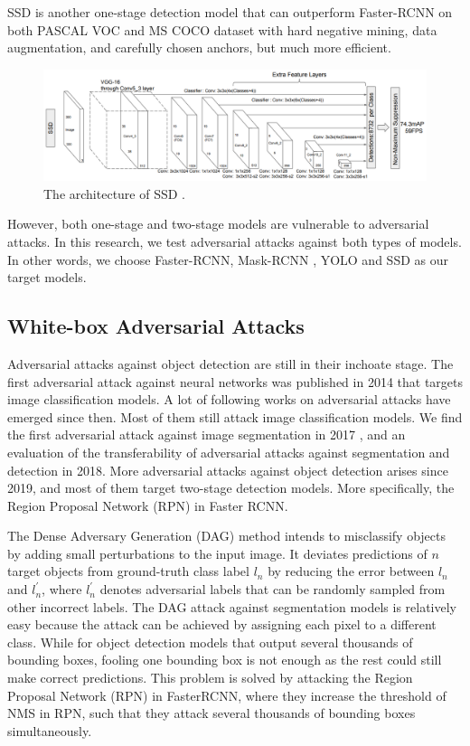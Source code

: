 SSD is another one-stage detection model that can outperform Faster-RCNN on both PASCAL VOC and MS COCO dataset with hard negative mining, data augmentation, and carefully chosen anchors, but much more efficient.

\begin{figure}[H]
\centering
\includegraphics[scale=0.6]{figures/chapter_detection/ssd.png}
\caption{The architecture of SSD \cite{liu2016ssd}.}
\label{fig.ssd}
\end{figure}

However, both one-stage and two-stage models are vulnerable to adversarial attacks. In this research, we test adversarial attacks against both types of models. In other words, we choose Faster-RCNN, Mask-RCNN \cite{he2017mask}, YOLO and SSD as our target models.


\subsection{White-box Adversarial Attacks}

Adversarial attacks against object detection are still in their inchoate stage. The first adversarial attack against neural networks was published in 2014 that targets image classification models. A lot of following works on adversarial attacks have emerged since then. Most of them still attack image classification models. We find the first adversarial attack against image segmentation in 2017 \cite{fischer2017adversarial}, and an evaluation of the transferability of adversarial attacks against segmentation and detection \cite{gurbaxani2018traits} in 2018. More adversarial attacks against object detection arises since 2019, and most of them target two-stage detection models. More specifically, the Region Proposal Network (RPN) in Faster RCNN.

The Dense Adversary Generation (DAG) \cite{xie2017adversarial} method intends to misclassify objects by adding small perturbations to the input image. It deviates predictions of $n$ target objects from ground-truth class label $l_n$ by reducing the error between $l_n$ and $l^{'}_{n}$, where $l^{'}_{n}$ denotes adversarial labels that can be randomly sampled from other incorrect labels. The DAG attack against segmentation models is relatively easy because the attack can be achieved by assigning each pixel to a different class. While for object detection models that output several thousands of bounding boxes, fooling one bounding box is not enough as the rest could still make correct predictions. This problem is solved by attacking the Region Proposal Network (RPN) in FasterRCNN, where they increase the threshold of NMS in RPN, such that they attack several thousands of bounding boxes simultaneously.

